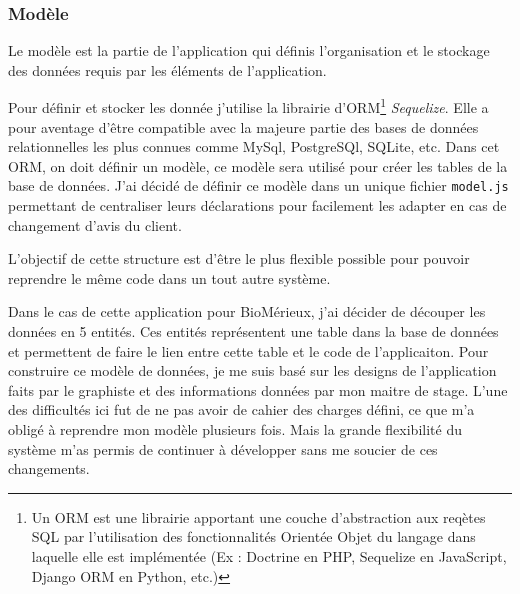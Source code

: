 \subsubsection{Modèle}

Le modèle est la partie de l'application qui définis l'organisation et le stockage des données requis par les éléments de l'application.

Pour définir et stocker les donnée j'utilise la librairie d'ORM\footnote{Un ORM est une librairie apportant une couche d'abstraction aux reqètes SQL par l'utilisation des fonctionnalités Orientée Objet du langage dans laquelle elle est implémentée (Ex : Doctrine en PHP, Sequelize en JavaScript, Django ORM en Python, etc.)} \emph{Sequelize}.
Elle a pour aventage d'être compatible avec la majeure partie des bases de données relationnelles les plus connues comme MySql, PostgreSQl, SQLite, etc.
Dans cet ORM, on doit définir un modèle, ce modèle sera utilisé pour créer les tables de la base de données.
J'ai décidé de définir ce modèle dans un unique fichier \texttt{model.js} permettant de centraliser leurs déclarations pour facilement les adapter en cas de changement d'avis du client.

L'objectif de cette structure est d'être le plus flexible possible pour pouvoir reprendre le même code dans un tout autre système.

\bigskip

Dans le cas de cette application pour BioMérieux, j'ai décider de découper les données en 5 entités.
Ces entités représentent une table dans la base de données et permettent de faire le lien entre cette table et le code de l'applicaiton.
Pour construire ce modèle de données, je me suis basé sur les designs de l'application faits par le graphiste et des informations données par mon maitre de stage.
L'une des difficultés ici fut de ne pas avoir de cahier des charges défini, ce que m'a obligé à reprendre mon modèle plusieurs fois.
Mais la grande flexibilité du système m'as permis de continuer à développer sans me soucier de ces changements.

\bigskip

